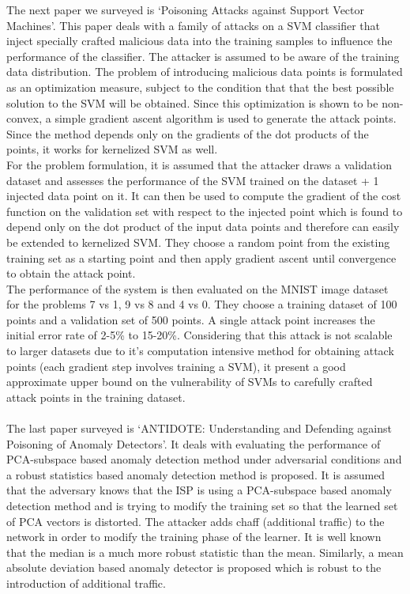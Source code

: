 \documentclass[11pt]{article}
\begin{document}
The next paper we surveyed is `Poisoning Attacks against Support Vector Machines'. This paper deals with a family of attacks on a SVM classifier that inject specially crafted malicious data into the training samples to influence the performance of the classifier. The attacker is assumed to be aware of the training data distribution. The problem of introducing malicious data points is formulated as an optimization measure, subject to the condition that that the best possible solution to the SVM will be obtained. Since this optimization is shown to be non-convex, a simple gradient ascent algorithm is used to generate the attack points. Since the method depends only on the gradients of the dot products of the points, it works for kernelized SVM as well. \\For the problem formulation, it is assumed that the attacker draws a validation dataset and assesses the performance of the SVM trained on the dataset + 1 injected data point on it. It can then be used to compute the gradient of the cost function on the validation set with respect to the injected point which is found to depend only on the dot product of the input data points and therefore can easily be extended to kernelized SVM. They choose a random point from the existing training set as a starting point and then apply gradient ascent until convergence to obtain the attack point.\\
The performance of the system is then evaluated on the MNIST image dataset for the problems 7 vs 1, 9 vs 8 and 4 vs 0. They choose a training dataset of 100 points and a validation set of 500 points. A single attack point increases the initial error rate of 2-5\% to 15-20\%. Considering that this attack is not scalable to larger datasets due to it's computation intensive method for obtaining attack points (each gradient step involves training a SVM), it present a good approximate upper bound on the vulnerability of SVMs to carefully crafted attack points in the training dataset. \\ \\
The last paper surveyed is `ANTIDOTE: Understanding and Defending against Poisoning of Anomaly Detectors'. It deals with evaluating the performance of PCA-subspace based anomaly detection method under adversarial conditions and a robust statistics based anomaly detection method is proposed. It is assumed that the adversary knows that the ISP is using a PCA-subspace based anomaly detection method and is trying to modify the training set so that the learned set of PCA vectors is distorted. The attacker adds chaff (additional traffic) to the network in order to modify the training phase of the learner. It is well known that the median is a much more robust statistic than the mean. Similarly, a mean absolute deviation based anomaly detector is proposed which is robust to the introduction of additional traffic. \\
\end{document}
